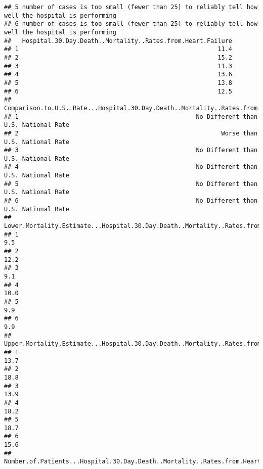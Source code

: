 \documentclass[
]{article}
\begin{document}
\begin{verbatim}
## 5 number of cases is too small (fewer than 25) to reliably tell how well the hospital is performing
## 6 number of cases is too small (fewer than 25) to reliably tell how well the hospital is performing
##   Hospital.30.Day.Death..Mortality..Rates.from.Heart.Failure
## 1                                                       11.4
## 2                                                       15.2
## 3                                                       11.3
## 4                                                       13.6
## 5                                                       13.8
## 6                                                       12.5
##   Comparison.to.U.S..Rate...Hospital.30.Day.Death..Mortality..Rates.from.Heart.Failure
## 1                                                 No Different than U.S. National Rate
## 2                                                        Worse than U.S. National Rate
## 3                                                 No Different than U.S. National Rate
## 4                                                 No Different than U.S. National Rate
## 5                                                 No Different than U.S. National Rate
## 6                                                 No Different than U.S. National Rate
##   Lower.Mortality.Estimate...Hospital.30.Day.Death..Mortality..Rates.from.Heart.Failure
## 1                                                                                   9.5
## 2                                                                                  12.2
## 3                                                                                   9.1
## 4                                                                                  10.0
## 5                                                                                   9.9
## 6                                                                                   9.9
##   Upper.Mortality.Estimate...Hospital.30.Day.Death..Mortality..Rates.from.Heart.Failure
## 1                                                                                  13.7
## 2                                                                                  18.8
## 3                                                                                  13.9
## 4                                                                                  18.2
## 5                                                                                  18.7
## 6                                                                                  15.6
##   Number.of.Patients...Hospital.30.Day.Death..Mortality..Rates.from.Heart.Failure

\end{verbatim}
\end{document}

